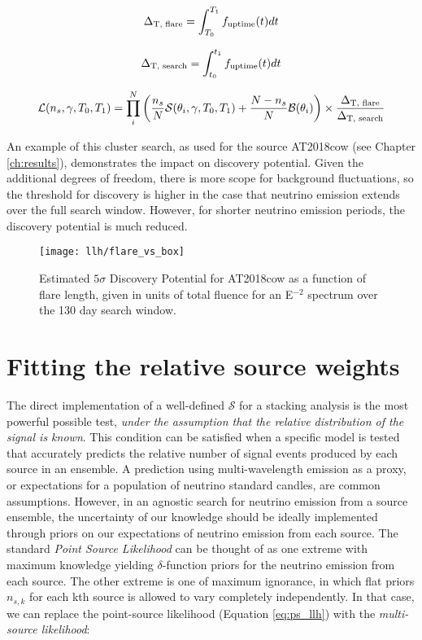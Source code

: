 \begin{equation}
\Delta_{\textup{T, flare}} = \int_{T_{0}}^{T_{1}}f_{\textup{uptime}}(t) dt
\end{equation}

\begin{equation}
\Delta_{\textup{T, search}} = \int_{t_{0}}^{t_{1}}f_{\textup{uptime}}(t) dt
\end{equation}

\begin{equation}
\mathcal{L}(n_{s}, \gamma, T_{0}, T_{1}) = \prod_{i}^{N} \left(\frac{n_{s}}{N} \mathcal{S}(\theta_{i}, \gamma, T_{0}, T_{1}) + \frac{N - n_{s}}{N} \mathcal{B}(\theta_{i})  \right) \times \frac{\Delta_{\textup{T, flare}}}{\Delta_{\textup{T, search}}}
\end{equation}

An example of this cluster search, as used for the source AT2018cow (see Chapter \ref{ch:results}), demonstrates the impact on discovery potential. Given the additional degrees of freedom, there is more scope for background fluctuations, so the threshold for discovery is higher in the case that neutrino emission extends over the full search window. However, for shorter neutrino emission periods, the discovery potential is much reduced.

\begin{figure}[!ht]
	\centering \texttt{[image: llh/flare\_vs\_box]}
	\caption{Estimated $5\sigma$ Discovery Potential for AT2018cow as a function of flare length, given in units of total fluence for an E$^{-2}$ spectrum over the 130 day search window.}
	\label{fig:DiscTime}
\end{figure}

\section{Fitting the relative source weights}
\label{sec:fit_weights}

The direct implementation of a well-defined $\mathcal{S}$ for a stacking analysis is the most powerful possible test, \emph{under the assumption that the relative distribution of the signal is known}. This condition can be satisfied when a specific model is tested that accurately predicts the relative number of signal events produced by each source in an ensemble. A prediction using multi-wavelength emission as a proxy, or expectations for a population of neutrino standard candles, are common assumptions. However, in an agnostic search for neutrino emission from a source ensemble, the uncertainty of our knowledge should be ideally implemented through priors on our expectations of neutrino emission from each source. The standard \emph{Point Source Likelihood} can be thought of as one extreme with maximum knowledge yielding $\delta$-function priors for the neutrino emission from each source. The other extreme is one of maximum ignorance, in which flat priors $n_{s, k}$ for each kth source is allowed to vary completely independently. In that case, we can replace the point-source likelihood (Equation \ref{eq:ps_llh}) with the \emph{multi-source likelihood}:

